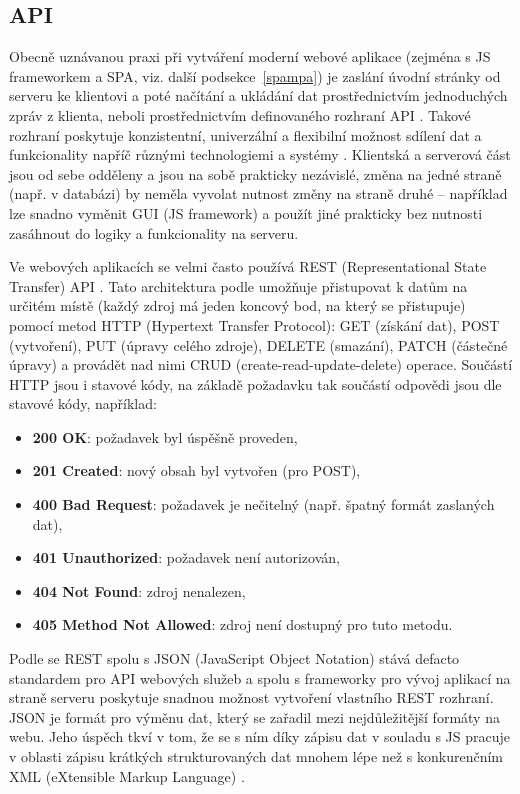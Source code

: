         \subsection{API}\label{api}
        Obecně uznávanou praxi při vytváření moderní webové aplikace (zejména s JS frameworkem a SPA, viz. další podsekce~\ref{spampa}) je zaslání úvodní stránky od serveru ke klientovi a poté načítání a ukládání dat prostřednictvím jednoduchých zpráv z klienta, neboli prostřednictvím definovaného rozhraní API \cite{api1}. 
        Takové rozhraní poskytuje konzistentní, univerzální a flexibilní možnost sdílení dat a funkcionality napříč různými technologiemi a systémy \cite{api2}. Klientská a serverová část jsou od sebe odděleny a jsou na sobě prakticky nezávislé, změna na jedné straně (např. v databázi) by neměla vyvolat nutnost změny na straně druhé \cite{api3} -- například lze snadno vyměnit GUI (JS framework) a použít jiné prakticky bez nutnosti zasáhnout do logiky a funkcionality na serveru.
        
        Ve webových aplikacích se velmi často používá REST (Representational State Transfer) API \cite{api1}. Tato architektura podle \cite{api4} umožňuje přistupovat k datům na určitém místě (každý zdroj má jeden koncový bod, na který se přistupuje) pomocí metod HTTP (Hypertext Transfer Protocol): GET (získání dat), POST (vytvoření), PUT (úpravy celého zdroje), DELETE (smazání), PATCH (částečné úpravy) a provádět nad nimi CRUD (create-read-update-delete) operace. Součástí HTTP jsou i stavové kódy, na základě požadavku tak součástí odpovědi jsou dle \cite{api4} stavové kódy, například:
            \begin{itemize}
                \item \textbf{200 OK}: požadavek byl úspěšně proveden,
                \item \textbf{201 Created}: nový obsah byl vytvořen (pro POST),
                \item \textbf{400 Bad Request}: požadavek je nečitelný (např. špatný formát zaslaných dat),
                \item \textbf{401 Unauthorized}: požadavek není autorizován,
                \item \textbf{404 Not Found}: zdroj nenalezen,
                \item \textbf{405 Method Not Allowed}: zdroj není dostupný pro tuto metodu.
            \end{itemize}
        Podle \cite{api5} se REST spolu s JSON (JavaScript Object Notation) stává defacto standardem pro API webových služeb a spolu s frameworky pro vývoj aplikací na straně serveru poskytuje snadnou možnost vytvoření vlastního REST rozhraní. JSON je formát pro výměnu dat, který se zařadil mezi nejdůležitější formáty na webu. Jeho úspěch tkví v tom, že se s ním díky zápisu dat v souladu s JS pracuje v oblasti zápisu krátkých strukturovaných dat mnohem lépe než s konkurenčním XML (eXtensible Markup Language) \cite{api6}.
        
